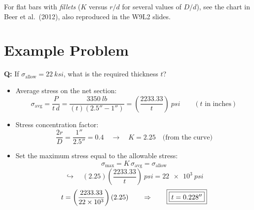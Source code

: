 \documentclass[11pt]{article}
\begin{document}
\noindent
For flat bars with \emph{fillets} ($K$ versus $r/d$ for several values of $D/d$), see the
chart in Beer et al.\ (2012), also reproduced in the W9L2 slides.

\section*{Example Problem}

\noindent
\begin{minipage}[c]{0.62\textwidth}
\centering
{}
\end{minipage}%
\hfill
\begin{minipage}[c]{0.35\textwidth}
\textbf{Q:} If $\sigma_{\text{allow}} = \SI{22}{ksi}$, what is the required
thickness $t$?
\end{minipage}

\bigskip
\begin{itemize}
  \item Average stress on the net section:
        \[
          \sigma_{\text{avg}} = \frac{P}{t\,d} = \frac{\SI{3350}{lb}}{(t)(2.5'' - 1'')}
          = \left(\frac{2233.33}{t}\right)\ \si{psi}
          \qquad (t \text{ in inches})
        \]
  \item Stress concentration factor:
        \[
          \frac{2r}{D} = \frac{1''}{2.5''} = 0.4
          \quad\longrightarrow\quad
          \boxed{K = 2.25} \quad \text{(from the curve)}
        \]
  \item Set the maximum stress equal to the allowable stress:
        \[
          \sigma_{\max} = K\,\sigma_{\text{avg}} = \sigma_{\text{allow}}
        \]
        \[
          \hookrightarrow\quad (2.25)\left(\frac{2233.33}{t}\right)\ \si{psi}
          = \SI{22e3}{psi}
        \]
        \[
          t = \left(\frac{2233.33}{\num{22e3}}\right)(2.25)
          \qquad\Rightarrow\qquad
          \fbox{\fbox{$t = 0.228''$}}
        \]
\end{itemize}
\end{document}
